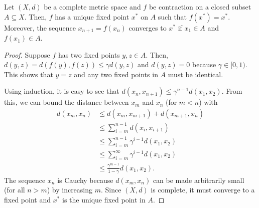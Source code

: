 \begin{theorem}
Let $(X,d)$ be a complete metric space and $f$ be contraction on a closed subset $A \subseteq X$.
Then, $f$ has a unique fixed point $x^*$ on $A$ such that $f(x^*) = x^*$.
Moreover, the sequence $x_{n+1} = f(x_n)$ converges to $x^*$ if $x_1 \in A$ and $f(x_1) \in A$.
\end{theorem}
\begin{proof}
Suppose $f$ has two fixed points $y,z\in A$.
Then, $d(y,z) = d \left(f(y),f(z) \right) \leq \gamma  d(y,z)$ and $d(y,z) = 0$ because $\gamma \in [0,1)$.
This shows that $y=z$ and any two fixed points in $A$ must be identical.

Using induction, it is easy to see that $d(x_n,x_{n+1}) \leq \gamma^{n-1} d(x_1,x_2)$.
From this, we can bound the distance between $x_m$ and $x_n$ (for $m<n$) with
\begin{align*}
d(x_m,x_n)
& \leq d(x_m,x_{m+1}) + d(x_{m+1},x_n) \\
& \leq \sum_{i=m}^{n-1} d(x_i,x_{i+1}) \\
& \leq \sum_{i=m}^{n-1} \gamma^{i-1} d(x_1,x_2) \\
& \leq \sum_{i=m}^\infty \gamma^{i-1} d(x_1,x_2) \\
& \leq \frac{\gamma^{m-1}}{1-\gamma} d(x_1,x_2).
\end{align*}
The sequence $x_n$ is Cauchy because $d(x_m,x_n)$ can be made arbitrarily small (for all $n>m$) by increasing $m$.
Since $(X,d)$ is complete, it must converge to a fixed point and $x^*$ is the unique fixed point in $A$.
\end{proof}


